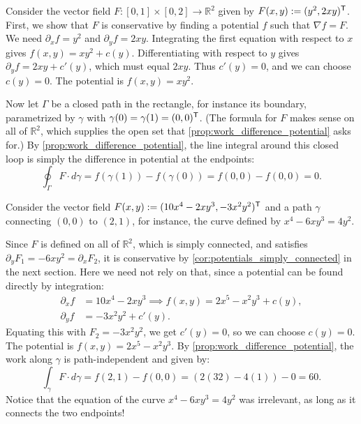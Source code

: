 \begin{example}
\label{ex:conservative_field_integral}
Consider the vector field $F : [0,1] \times [0,2] \to \mathbb{R}^2$ given by $F(x,y) := (y^2, 2xy)^{\mathsf{T}}$.
First, we show that $F$ is conservative by finding a potential $f$ such that $\nabla f = F$. We need $\partial_x f = y^2$ and $\partial_y f = 2xy$. Integrating the first equation with respect to $x$ gives $f(x,y) = xy^2 + c(y)$. Differentiating with respect to $y$ gives $\partial_y f = 2xy + c'(y)$, which must equal $2xy$. Thus $c'(y) = 0$, and we can choose $c(y) = 0$. The potential is $f(x,y) = xy^2$.

Now let $\Gamma$ be a closed path in the rectangle, for instance its boundary, parametrized by
$\gamma$ with $\gamma(0) = \gamma(1) = (0,0)^{\mathsf{T}}$. (The formula for $F$ makes sense on all of
$\mathbb{R}^2$, which supplies the open set that \cref{prop:work_difference_potential} asks for.) By \cref{prop:work_difference_potential}, the line integral around this closed loop is simply the difference in potential at the endpoints:
\[\oint_\Gamma F \cdot d\gamma = f(\gamma(1)) - f(\gamma(0)) = f(0,0) - f(0,0) = 0.\]
\end{example}

\begin{example}
\label{ex:line_integral_potential}
Consider the vector field $F(x,y) := (10x^4 - 2xy^3, -3x^2y^2)^{\mathsf{T}}$ and a path $\gamma$ connecting $(0,0)$ to $(2,1)$, for instance, the curve defined by $x^4 - 6xy^3 = 4y^2$.

Since $F$ is defined on all of $\mathbb{R}^2$, which is simply connected, and satisfies $\partial_y F_1 = -6xy^2 = \partial_x F_2$, it is conservative by \cref{cor:potentials_simply_connected} in the next section. Here we need not rely on that, since a potential can be found directly by integration:
\begin{align*}
\partial_x f &= 10x^4 - 2xy^3 \implies f(x,y) = 2x^5 - x^2y^3 + c(y), \\
\partial_y f &= -3x^2y^2 + c'(y).
\end{align*}
Equating this with $F_2 = -3x^2y^2$, we get $c'(y) = 0$, so we can choose $c(y) = 0$. The potential is $f(x,y) = 2x^5 - x^2y^3$.
By \cref{prop:work_difference_potential}, the work along $\gamma$ is path-independent and given by:
\[\int_\gamma F \cdot d\gamma = f(2,1) - f(0,0) = (2(32) - 4(1)) - 0 = 60.\]
Notice that the equation of the curve $x^4 - 6xy^3 = 4y^2$ was irrelevant, as long as it connects the two endpoints!
\end{example}

